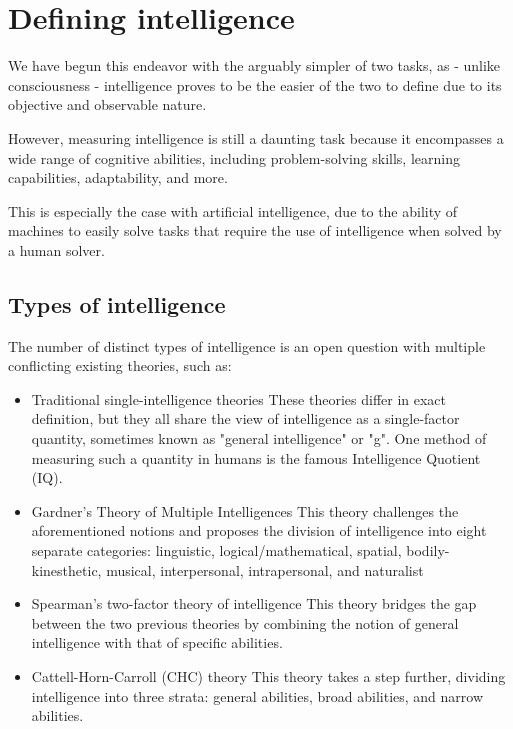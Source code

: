 \documentclass[masterthesis]{fer}
\begin{document}
\section{Defining intelligence}
We have begun this endeavor with the arguably simpler of two tasks, as - unlike consciousness - intelligence proves to be the easier of the two to define due to its objective and observable nature. 

However, measuring intelligence is still a daunting task because it encompasses a wide range of cognitive abilities, including problem-solving skills, learning capabilities, adaptability, and more.

This is especially the case with artificial intelligence, due to the ability of machines to easily solve tasks that require the use of intelligence when solved by a human solver.
\subsection{Types of intelligence}
The number of distinct types of intelligence is an open question with multiple conflicting existing theories, such as: %
\begin{itemize}
\item{Traditional single-intelligence theories}
These theories differ in exact definition, but they all share the view of intelligence as a single-factor quantity, sometimes known as "general intelligence" or "g". One method of measuring such a quantity in humans is the famous Intelligence Quotient (IQ).
\item{Gardner's Theory of Multiple Intelligences}
This theory challenges the aforementioned notions and proposes the division of intelligence into eight separate categories: linguistic, logical/mathematical, spatial, bodily-kinesthetic, musical, interpersonal, intrapersonal, and naturalist
\item{Spearman's two-factor theory of intelligence}
This theory bridges the gap between the two previous theories by combining the notion of general intelligence with that of specific abilities.
\item{Cattell-Horn-Carroll (CHC) theory}
This theory takes a step further, dividing intelligence into three strata: general abilities, broad abilities, and narrow abilities.
\end{itemize}
\end{document}
